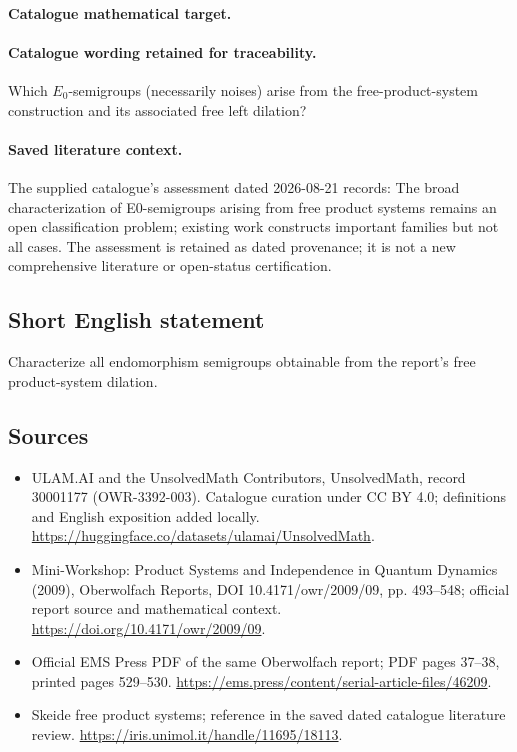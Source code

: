 \documentclass[11pt]{article}
\begin{document}
\paragraph{Catalogue mathematical target.}
\paragraph{Catalogue wording retained for traceability.}
Which $E_0$-semigroups (necessarily noises) arise from the free-product-system construction and its associated free left dilation?

\paragraph{Saved literature context.} The supplied catalogue's assessment dated 2026-08-21 records: The broad characterization of E0-semigroups arising from free product systems remains an open classification problem; existing work constructs important families but not all cases. The assessment is retained as dated provenance; it is not a new comprehensive literature or open-status certification.
\subsection{Short English statement}
Characterize all endomorphism semigroups obtainable from the report's free product-system dilation.
\subsection{Sources}
\begin{itemize}
\item[\hypertarget{source:30001177:1}{S1}] ULAM.AI and the UnsolvedMath Contributors, UnsolvedMath, record 30001177 (OWR-3392-003). Catalogue curation under CC BY 4.0; definitions and English exposition added locally.
\url{https://huggingface.co/datasets/ulamai/UnsolvedMath}.
\item[\hypertarget{source:30001177:2}{S2}] Mini-Workshop: Product Systems and Independence in Quantum Dynamics (2009), Oberwolfach Reports, DOI 10.4171/owr/2009/09, pp. 493--548; official report source and mathematical context.
\url{https://doi.org/10.4171/owr/2009/09}.
\item[\hypertarget{source:30001177:3}{S3}] Official EMS Press PDF of the same Oberwolfach report; PDF pages 37--38, printed pages 529--530.
\url{https://ems.press/content/serial-article-files/46209}.
\item[\hypertarget{source:30001177:4}{S4}] Skeide free product systems; reference in the saved dated catalogue literature review.
\url{https://iris.unimol.it/handle/11695/18113}.
\end{itemize}
\label{end:30001177}
\end{document}
